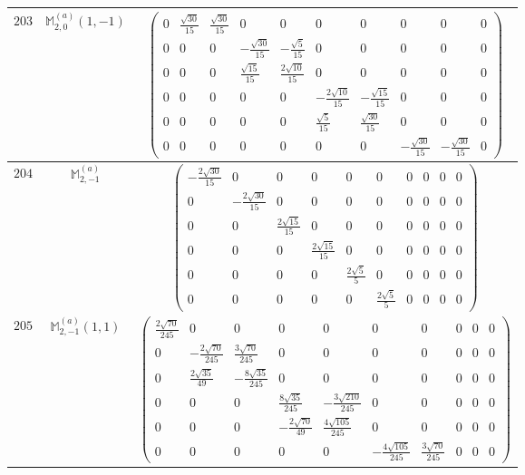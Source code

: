\documentclass[fleqn,8pt,landscape]{jsarticle}
\begin{document}
\begin{center}
\begin{longtable}{ccc}
$ 203 $ & $ \mathbb{M}_{2,0}^{(a)}(1,-1) $ & $ \begin{pmatrix} 0 & \frac{\sqrt{30}}{15} & \frac{\sqrt{30}}{15} & 0 & 0 & 0 & 0 & 0 & 0 & 0 \\ 0 & 0 & 0 & - \frac{\sqrt{30}}{15} & - \frac{\sqrt{5}}{15} & 0 & 0 & 0 & 0 & 0 \\ 0 & 0 & 0 & \frac{\sqrt{15}}{15} & \frac{2 \sqrt{10}}{15} & 0 & 0 & 0 & 0 & 0 \\ 0 & 0 & 0 & 0 & 0 & - \frac{2 \sqrt{10}}{15} & - \frac{\sqrt{15}}{15} & 0 & 0 & 0 \\ 0 & 0 & 0 & 0 & 0 & \frac{\sqrt{5}}{15} & \frac{\sqrt{30}}{15} & 0 & 0 & 0 \\ 0 & 0 & 0 & 0 & 0 & 0 & 0 & - \frac{\sqrt{30}}{15} & - \frac{\sqrt{30}}{15} & 0 \end{pmatrix} $ \\ \hline
$ 204 $ & $ \mathbb{M}_{2,-1}^{(a)} $ & $ \begin{pmatrix} - \frac{2 \sqrt{30}}{15} & 0 & 0 & 0 & 0 & 0 & 0 & 0 & 0 & 0 \\ 0 & - \frac{2 \sqrt{30}}{15} & 0 & 0 & 0 & 0 & 0 & 0 & 0 & 0 \\ 0 & 0 & \frac{2 \sqrt{15}}{15} & 0 & 0 & 0 & 0 & 0 & 0 & 0 \\ 0 & 0 & 0 & \frac{2 \sqrt{15}}{15} & 0 & 0 & 0 & 0 & 0 & 0 \\ 0 & 0 & 0 & 0 & \frac{2 \sqrt{5}}{5} & 0 & 0 & 0 & 0 & 0 \\ 0 & 0 & 0 & 0 & 0 & \frac{2 \sqrt{5}}{5} & 0 & 0 & 0 & 0 \end{pmatrix} $ \\ \hline
$ 205 $ & $ \mathbb{M}_{2,-1}^{(a)}(1,1) $ & $ \begin{pmatrix} \frac{2 \sqrt{70}}{245} & 0 & 0 & 0 & 0 & 0 & 0 & 0 & 0 & 0 \\ 0 & - \frac{2 \sqrt{70}}{245} & \frac{3 \sqrt{70}}{245} & 0 & 0 & 0 & 0 & 0 & 0 & 0 \\ 0 & \frac{2 \sqrt{35}}{49} & - \frac{8 \sqrt{35}}{245} & 0 & 0 & 0 & 0 & 0 & 0 & 0 \\ 0 & 0 & 0 & \frac{8 \sqrt{35}}{245} & - \frac{3 \sqrt{210}}{245} & 0 & 0 & 0 & 0 & 0 \\ 0 & 0 & 0 & - \frac{2 \sqrt{70}}{49} & \frac{4 \sqrt{105}}{245} & 0 & 0 & 0 & 0 & 0 \\ 0 & 0 & 0 & 0 & 0 & - \frac{4 \sqrt{105}}{245} & \frac{3 \sqrt{70}}{245} & 0 & 0 & 0 \end{pmatrix} $ \\ \hline

\end{longtable}
\end{center}
\end{document}
